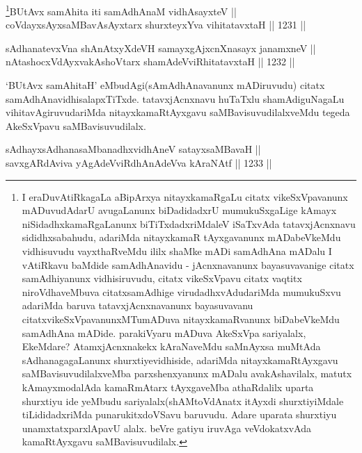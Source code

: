 
\begin{shl}
\footnote{I eraDuvAtiRkagaLa aBipArxya nitayxkamaRgaLu citatx vikeSxVpavanunx mADuvudAdarU avugaLanunx biDadidadxrU mumukuSxgaLige kAmayx niSidadhxkamaRgaLanunx biTiTxdadxriMdaleV iSaTxvAda tatavxjAcnxnavu sididhxsabahudu, adariMda nitayxkamaR tAyxgavanunx mADabeVkeMdu vidhisuvudu vayxthaRveMdu ililx shaMke mADi samAdhAna  mADalu I vAtiRkavu baMdide samAdhAnavidu - jAcnxnavanunx bayasuvavanige citatx samAdhiyanunx vidhisiruvudu, citatx vikeSxVpavu citatx vaqtitx niroVdhaveMbuva citatxsamAdhige virudadhxvAdudariMda mumukuSxvu adariMda baruva tatavxjAcnxnavanunx bayasuvavanu citatxvikeSxVpavanunxMTumADuva nitayxkamaRvanunx biDabeVkeMdu samAdhAna mADide. parakiVyaru mADuva AkeSxVpa sariyalalx, EkeMdare? AtamxjAcnxnakekx kAraNaveMdu saMnAyxsa muMtAda sAdhanagagaLanunx shurxtiyevidhiside, adariMda nitayxkamaRtAyxgavu saMBavisuvudilalxveMba parxshenxyanunx mADalu avakAshavilalx, matutx kAmayxmodalAda kamaRmAtarx tAyxgaveMba athaRdalilx uparta shurxtiyu ide yeMbudu sariyalalx(shAMtoVdAnatx itAyxdi shurxtiyiMdale tiLididadxriMda punarukitxdoVSavu baruvudu. Adare uparata shurxtiyu unamxtatxparxlApavU alalx. beVre gatiyu iruvAga veVdokatxvAda kamaRtAyxgavu saMBavisuvudilalx.}BUtAvx samAhita iti samAdhAnaM vidhAsayxteV || \\
coVdayxsAyxsaMBavA\s sAyxtarx shurxteyxYva vihitatavxtaH \hfill || 1231 ||  
\end{shl}
				
\begin{shl}
sAdhanatevxVna shAnAtxyXdeVH samayxgAjxcnXnasayx janamxneV || \\
nAtashocxVdAyxvakAshoV\s tarx shamAdeVviRhitatavxtaH \hfill || 1232 ||  
\end{shl}

\begin{artha}
`BUtAvx samAhitaH' eMbudAgi(sAmAdhAnavanunx mADiruvudu) citatx samAdhAnavidhisalapxTiTxde. tatavxjAcnxnavu huTaTxlu shamAdiguNagaLu vihitavAgiruvudariMda nitayxkamaRtAyxgavu saMBavisuvudilalxveMdu tegeda AkeSxVpavu saMBavisuvudilalx.
\end{artha}


\begin{shl}
sAdhayxsAdhanasaMbanadhxvidhAneV satayxsaMBavaH ||  \\
savxgARdAviva yAgAdeVviRdhAnAdeVva kAraNAtf \hfill || 1233 ||  
\end{shl}

